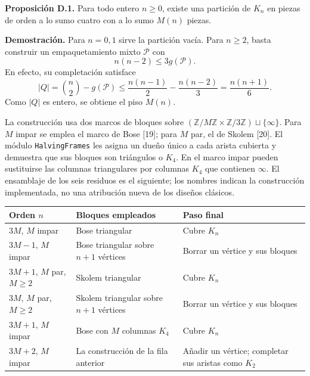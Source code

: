 \documentclass[spanish,11pt,a4paper]{article}
\newcounter{none}
\begin{document}
\textbf{Proposición D.1.} Para todo entero \(n\ge0\), existe una partición de \(K_n\) en piezas de orden a lo sumo cuatro con a lo sumo \(M(n)\) piezas.

\textbf{Demostración.} Para \(n=0,1\) sirve la partición vacía. Para \(n\ge2\), basta construir un empaquetamiento mixto \(\mathcal P\) con \[
n(n-2)\le3g(\mathcal P).
\tag{D.1}
\] En efecto, su completación satisface \[
|Q|=\binom n2-g(\mathcal P)
\le\frac{n(n-1)}2-\frac{n(n-2)}3
=\frac{n(n+1)}6.
\tag{D.2}
\] Como \(|Q|\) es entero, se obtiene el piso \(M(n)\).

La construcción usa dos marcos de bloques sobre \((\mathbb Z/M\mathbb Z\times\mathbb Z/3\mathbb Z)\sqcup\{\infty\}\). Para \(M\) impar se emplea el marco de Bose {[}19{]}; para \(M\) par, el de Skolem {[}20{]}. El módulo \nolinkurl{HalvingFrames} les asigna un dueño único a cada arista cubierta y demuestra que sus bloques son triángulos o \(K_4\). En el marco impar pueden sustituirse las columnas triangulares por columnas \(K_4\) que contienen \(\infty\). El ensamblaje de los seis residuos es el siguiente; los nombres indican la construcción implementada, no una atribución nueva de los diseños clásicos.


{\def\LTcaptype{none} %
\begin{longtable}[c]{@{}
  >{\raggedright\arraybackslash}p{}
  >{\raggedright\arraybackslash}p{}
  >{\raggedright\arraybackslash}p{}@{}}
\toprule\noalign{}
\begin{minipage}[b]{\linewidth}\raggedright
Orden \(n\)
\end{minipage} & \begin{minipage}[b]{\linewidth}\raggedright
Bloques empleados
\end{minipage} & \begin{minipage}[b]{\linewidth}\raggedright
Paso final
\end{minipage} \\
\midrule\noalign{}
\endhead
\bottomrule\noalign{}
\endlastfoot
\(3M\), \(M\) impar & Bose triangular & Cubre \(K_n\) \\
\(3M-1\), \(M\) impar & Bose triangular sobre \(n+1\) vértices & Borrar un vértice y sus bloques \\
\(3M+1\), \(M\) par, \(M\ge2\) & Skolem triangular & Cubre \(K_n\) \\
\(3M\), \(M\) par, \(M\ge2\) & Skolem triangular sobre \(n+1\) vértices & Borrar un vértice y sus bloques \\
\(3M+1\), \(M\) impar & Bose con \(M\) columnas \(K_4\) & Cubre \(K_n\) \\
\(3M+2\), \(M\) impar & La construcción de la fila anterior & Añadir un vértice; completar sus aristas como \(K_2\) \\
\end{longtable}
}
\end{document}
